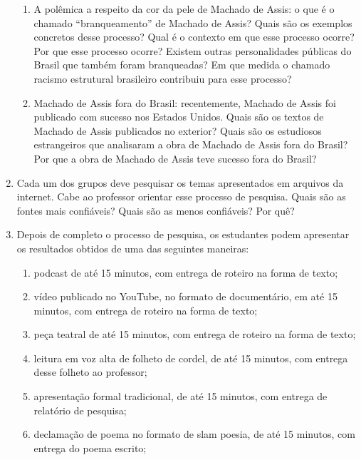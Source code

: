 \documentclass{extarticle}
\begin{document}
\begin{enumerate}
\begin{enumerate}
\item A polêmica a respeito da cor da pele de Machado de Assis: o que é o
chamado ``branqueamento'' de Machado de Assis? Quais são os exemplos
concretos desse processo? Qual é o contexto em que esse processo ocorre?
Por que esse processo ocorre? Existem outras personalidades públicas do
Brasil que também foram branqueadas? Em que medida o chamado racismo
estrutural brasileiro contribuiu para esse processo?

\item Machado de Assis fora do Brasil: recentemente, Machado de Assis foi
publicado com sucesso nos Estados Unidos. Quais são os textos de Machado
de Assis publicados no exterior? Quais são os estudiosos estrangeiros
que analisaram a obra de Machado de Assis fora do Brasil? Por que a obra
de Machado de Assis teve sucesso fora do Brasil?
\end{enumerate}

\item Cada um dos grupos deve pesquisar os temas apresentados em arquivos
da internet. Cabe ao professor orientar esse processo de pesquisa. Quais
são as fontes mais confiáveis? Quais são as menos confiáveis? Por quê?

\item Depois de completo o processo de pesquisa, os estudantes podem
apresentar os resultados obtidos de uma das seguintes maneiras:

\begin{enumerate}
\item podcast de até 15 minutos, com entrega de roteiro na forma de texto;

\item vídeo publicado no YouTube, no formato de documentário, em até 15
minutos, com entrega de roteiro na forma de texto;

\item peça teatral de até 15 minutos, com entrega de roteiro na forma de
texto;

\item leitura em voz alta de folheto de cordel, de até 15 minutos, com
entrega desse folheto ao professor;

\item apresentação formal tradicional, de até 15 minutos, com entrega de
relatório de pesquisa;

\item declamação de poema no formato de slam poesia, de até 15 minutos, com
entrega do poema escrito;


\end{enumerate}
\end{enumerate}
\end{document}

